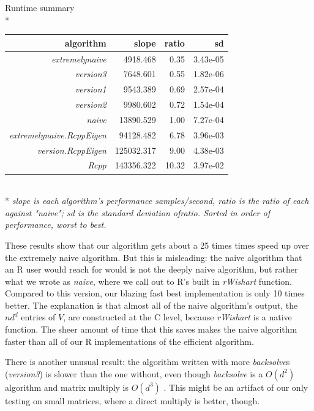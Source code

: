 \documentclass[english]{report}
\begin{document}
\begin{center}
Runtime summary\\*
\begin{tabular}{rrrr}
    algorithm       & slope  &      ratio   &        sd\\
    \hline
              \emph{extremelynaive}   &4918.468  & 0.35 & 3.43e-05 \\
                \emph{version3}   &7648.601 & 0.55 & 1.82e-06 \\
               \emph{version1}   &9543.389 & 0.69 &2.57e-04 \\
                \emph{version2}   & 9980.602 & 0.72 & 1.54e-04 \\
                   \emph{naive}  &13890.529  & 1.00 & 7.27e-04 \\
  \emph{extremelynaive.RcppEigen} & 94128.482 & 6.78 & 3.96e-03 \\
        \emph{version.RcppEigen} & 125032.317  & 9.00 & 4.38e-03 \\
                     \emph{Rcpp} & 143356.322  & 10.32 & 3.97e-02 \\
    \hline
\end{tabular} \\*
 \emph{
    \emph{slope} is each algorithm's performance samples/second,
    \emph{ratio} is the ratio of each against "naive";
    \emph{sd} is the standard deviation of\emph{ratio}. Sorted in order of performance, worst to best.
    }
\end{center}

These results show that our algorithm gets about a 25 times times speed up over the extremely naive algorithm. But this is misleading: the naive algorithm that an R user would reach for would is not the deeply naive algorithm, but rather what we wrote as \emph{naive}, where we call out to R's built in \emph{rWishart} function. Compared to this version, our blazing fast best implementation is only 10 times better. The explanation is that almost all of the naive algorithm's output, the $n d^d$ entries of $V$, are constructed at the C level, because \emph{rWishart} is a native function. The sheer amount of time that this saves makes the naive algorithm faster than all of our R implementations of the efficient algorithm.

There is another unusual result: the algorithm written with more \emph{backsolve}s (\emph{version3}) is slower than the one without, even though \emph{backsolve} is a $O(d^2)$ algorithm and matrix multiply is $O(d^3)$ \cite{?????}. This might be an artifact of our only testing on small matrices, where a direct multiply is better, though.
\end{document}
